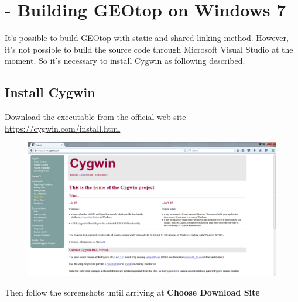 \section{ - Building GEOtop on Windows 7}\label{sec:20150825}

It's possible to build GEOtop with static and shared linking method. However, it's not possible to build the source code through Microsoft Visual Studio at the moment. So it's necessary to install Cygwin as following described.

\subsection{Install Cygwin}

Download the executable from the official web site \url{https://cygwin.com/install.html}

\begin{figure}[h!]
  \includegraphics[width=\linewidth]{2015/Aug/25/1pic.png}
\end{figure}

Then follow the screenshots until arriving at \textbf{Choose Download Site}

\pagebreak

